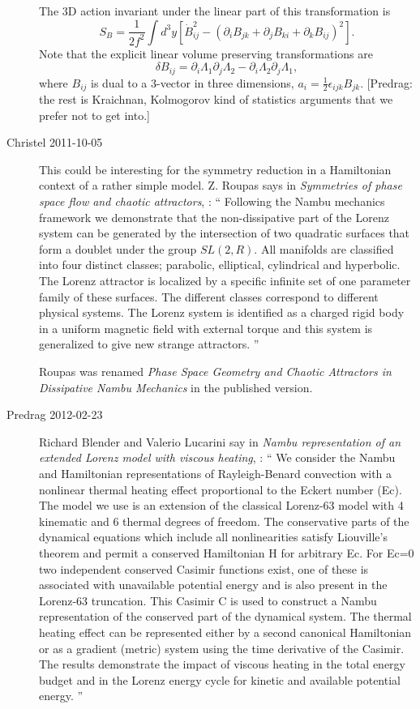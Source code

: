 \begin{description}
The 3D action invariant under the linear part of this transformation is
\begin{equation}
S_B = \frac{1}{2 f^2}  \int d^3y [  \dot{B}_{ij}^2 - (\partial_i B_{jk} +\partial_j B_{ki} +\partial_k B_{ij})^2].
\end{equation}
Note that the explicit linear volume preserving transformations are
\begin{equation}
\delta B_{ij} = \partial_i \Lambda_1 \partial_j \Lambda_2 - \partial_i \Lambda_2
\partial_j \Lambda_1,
\end{equation}
where $B_{ij}$  is dual to a 3-vector in three dimensions,
$
a_i = \frac{1}{2} \epsilon_{ijk} B_{jk}
$.
[Predrag: the rest is Kraichnan, Kolmogorov kind of statistics arguments that
we prefer not to get into.]

\item[Christel 2011-10-05 ] This could be interesting for the symmetry
reduction in a Hamiltonian context of a rather simple model.
Z. Roupas says in
\emph{Symmetries of phase space flow and chaotic attractors},
 : ``
Following the Nambu mechanics framework we demonstrate that the
non-dissipative part of the Lorenz system can be generated by the
intersection of two quadratic surfaces that form a doublet under the
group $SL(2,R)$. All manifolds are classified into four distinct classes;
parabolic, elliptical, cylindrical and hyperbolic. The Lorenz attractor
is localized by a specific infinite set of one parameter family of these
surfaces. The different classes correspond to different physical systems.
The Lorenz system is identified as a charged rigid body in a uniform
magnetic field with external torque and this system is generalized to
give new strange attractors.
''

Roupas was renamed \emph{Phase Space Geometry and Chaotic
Attractors in Dissipative Nambu Mechanics} in the published version.

\item[Predrag 2012-02-23 ]
Richard Blender and Valerio Lucarini say  in
\emph{Nambu representation of an extended Lorenz model with viscous heating},
 : ``
We consider the Nambu and Hamiltonian representations of Rayleigh-Benard
convection with a nonlinear thermal heating effect proportional to the
Eckert number (Ec). The model we use is an extension of the classical
Lorenz-63 model with 4 kinematic and 6 thermal degrees of freedom. The
conservative parts of the dynamical equations which include all
nonlinearities satisfy Liouville's theorem and permit a conserved
Hamiltonian H for arbitrary Ec. For Ec=0 two independent conserved
Casimir functions exist, one of these is associated with unavailable
potential energy and is also present in the Lorenz-63 truncation. This
Casimir C is used to construct a Nambu representation of the conserved
part of the dynamical system. The thermal heating effect can be
represented either by a second canonical Hamiltonian or as a gradient
(metric) system using the time derivative of the Casimir. The results
demonstrate the impact of viscous heating in the total energy budget and
in the Lorenz energy cycle for kinetic and available potential energy.
 ''



\end{description}
